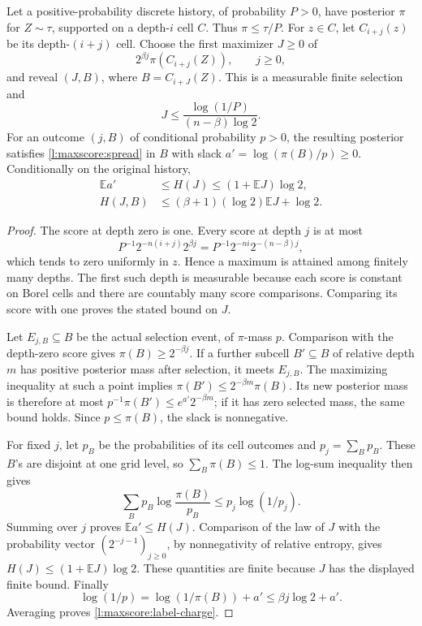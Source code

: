\begin{lemma}\label{l:maxscore:refinement}
Let a positive-probability discrete history, of probability \(P>0\),
have posterior \(\pi\) for \(Z\sim\tau\), supported on a depth-\(i\)
cell \(C\).  Thus \(\pi\le\tau/P\).  For \(z\in C\), let
\(C_{i+j}(z)\) be its depth-\((i+j)\) cell.  Choose the first
maximizer \(J\ge0\) of
\[
 2^{\beta j}\pi(C_{i+j}(Z)),\qquad j\ge0,
\]
and reveal \((J,B)\), where \(B=C_{i+J}(Z)\).
This is a measurable finite selection and
\[
 J\le\frac{\log(1/P)}{(n-\beta)\log2}.
\]
For an outcome \((j,B)\) of conditional probability \(p>0\),
the resulting posterior satisfies \eqref{l:maxscore:spread} in \(B\)
with slack \(a'=\log(\pi(B)/p)\ge0\).  Conditionally on the original
history,
\begin{align}
 \mathbb E a'&\le H(J)\le(1+\mathbb EJ)\log2,
 \label{l:maxscore:slack-charge}\\
 H(J,B)&\le(\beta+1)(\log2)\mathbb EJ+\log2.
 \label{l:maxscore:label-charge}
\end{align}
\end{lemma}

\begin{proof}
The score at depth zero is one.  Every score at depth \(j\) is at most
\[
 P^{-1}2^{-n(i+j)}2^{\beta j}
 =P^{-1}2^{-ni}2^{-(n-\beta)j},
\]
which tends to zero uniformly in \(z\).  Hence a maximum is attained
among finitely many depths.  The first such depth is measurable because
each score is constant on Borel cells and there are countably many
score comparisons.  Comparing its score with one proves the stated
bound on \(J\).

Let \(E_{j,B}\subseteq B\) be the actual selection event, of
\(\pi\)-mass \(p\).  Comparison with the depth-zero score gives
\(\pi(B)\ge2^{-\beta j}\).  If a further subcell
\(B'\subseteq B\) of relative depth \(m\) has positive posterior
mass after selection, it meets \(E_{j,B}\).  The maximizing inequality
at such a point implies
\(\pi(B')\le2^{-\beta m}\pi(B)\).  Its new posterior mass is
therefore at most \(p^{-1}\pi(B')\le e^{a'}2^{-\beta m}\);
if it has zero selected mass, the same bound holds.  Since
\(p\le\pi(B)\), the slack is nonnegative.

For fixed \(j\), let \(p_B\) be the probabilities of its cell
outcomes and \(p_j=\sum_Bp_B\).  These \(B\)'s are disjoint at
one grid level, so \(\sum_B\pi(B)\le1\).  The log-sum inequality
then gives
\[
 \sum_Bp_B\log\frac{\pi(B)}{p_B}\le p_j\log(1/p_j).
\]
Summing over \(j\) proves \(\mathbb E a'\le H(J)\).
Comparison of the law of \(J\) with the probability vector
\((2^{-j-1})_{j\ge0}\), by nonnegativity of relative entropy,
gives \(H(J)\le(1+\mathbb EJ)\log2\).  These quantities are
finite because \(J\) has the displayed finite bound.
Finally
\[
 \log(1/p)=\log(1/\pi(B))+a'\le\beta j\log2+a'.
\]
Averaging proves \eqref{l:maxscore:label-charge}.
\end{proof}

